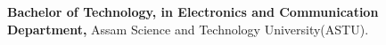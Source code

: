 
\begin{scholarship}
					{\textbf{Bachelor of Technology, in Electronics and Communication Department,} Assam Science and Technology University(ASTU).}	
\end{scholarship}